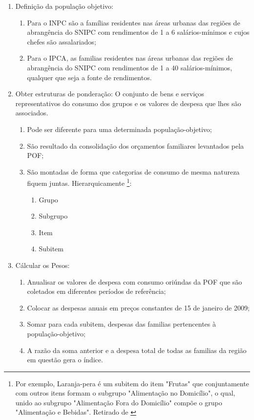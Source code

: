\documentclass[twoside,a4paper,12pt]{report}
\begin{document}
\begin{enumerate}
  \item Definição da população objetivo: 
  \begin{enumerate} 
    \item Para o INPC são a famílias residentes nas áreas urbanas das regiões de abrangência do SNIPC com rendimentos de 1 a 6 salários-mínimos e cujos chefes são assalariados; 
    \item Para o IPCA, as familias residentes nas áreas urbanas das regiões de abrangência do SNIPC com rendimentos de 1 a 40 salários-mínimos, qualquer que seja a fonte de rendimentos.
  \end{enumerate}
  \item Obter estruturas de ponderação: O conjunto de bens e serviços representativos do consumo dos grupos e os valores de despesa que lhes são associados. 
  \begin{enumerate}
    \item Pode ser diferente para uma determinada população-objetivo;
    \item São resultado da consolidação dos orçamentos familiares levantados pela POF;
    \item São montadas de forma que categorias de consumo de mesma natureza fiquem juntas. Hierarquicamente \footnote[2]{Por exemplo, Laranja-pera é um subitem do item "Frutas" que conjuntamente com outros itens formam o subgrupo "Alimentação no Domicílio", o qual, unido ao subgrupo "Alimentação Fora do Domicílio" compõe o grupo "Alimentação e Bebidas". Retirado de \citet{ibgemetodos}}: 
    \begin{enumerate}
      \item Grupo
      \item Subgrupo
      \item Item
      \item Subitem
    \end{enumerate}
  \end{enumerate}
  \item Cálcular os Pesos:
  \begin{enumerate}
    \item Anualisar os valores de despesa com consumo oriúndas da POF que são coletados em diferentes períodos de referência;
    \item Colocar as despesas anuais em preços constantes de 15 de janeiro de 2009;
    \item Somar para cada subitem, despesas das familias pertencentes à população-objetivo;
    \item A razão da soma anterior e a despesa total de todas as familias da região em questão gera o índice.

\end{enumerate}
\end{enumerate}
\end{document}
